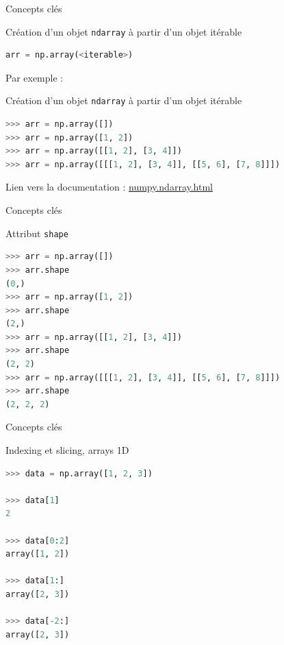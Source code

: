 \documentclass[10pt]{beamer}
\begin{document}
\begin{frame}[fragile]{Concepts clés}

\begin{block}{Création d'un objet \texttt{ndarray} à partir d'un objet itérable}

\begin{lstlisting}[language=python, numbers=none]
arr = np.array(<iterable>)
\end{lstlisting}

\end{block}

Par exemple :
\begin{block}{Création d'un objet \texttt{ndarray} à partir d'un objet itérable}

\begin{lstlisting}[language=python, numbers=none]
>>> arr = np.array([])
>>> arr = np.array([1, 2])
>>> arr = np.array([[1, 2], [3, 4]])
>>> arr = np.array([[[1, 2], [3, 4]], [[5, 6], [7, 8]]])
\end{lstlisting}

\end{block}

{\small
Lien vers la documentation : \href{https://numpy.org/doc/stable/reference/generated/numpy.ndarray.html}{numpy.ndarray.html}}
\end{frame}




\begin{frame}[fragile]{Concepts clés}

  \begin{block}{Attribut \texttt{shape}}
\begin{lstlisting}[language=python, numbers=none]
>>> arr = np.array([])
>>> arr.shape
(0,)
>>> arr = np.array([1, 2])
>>> arr.shape
(2,)
>>> arr = np.array([[1, 2], [3, 4]])
>>> arr.shape
(2, 2)
>>> arr = np.array([[[1, 2], [3, 4]], [[5, 6], [7, 8]]])
>>> arr.shape
(2, 2, 2)
\end{lstlisting}

\end{block}

\end{frame}

\begin{frame}[fragile]{Concepts clés}

  \begin{block}{Indexing et slicing, arrays 1D}

\begin{lstlisting}[language=python, numbers=none]
>>> data = np.array([1, 2, 3])

>>> data[1]
2

>>> data[0:2]
array([1, 2])

>>> data[1:]
array([2, 3])

>>> data[-2:]
array([2, 3])
\end{lstlisting}
  \end{block}
\end{frame}
\end{document}
